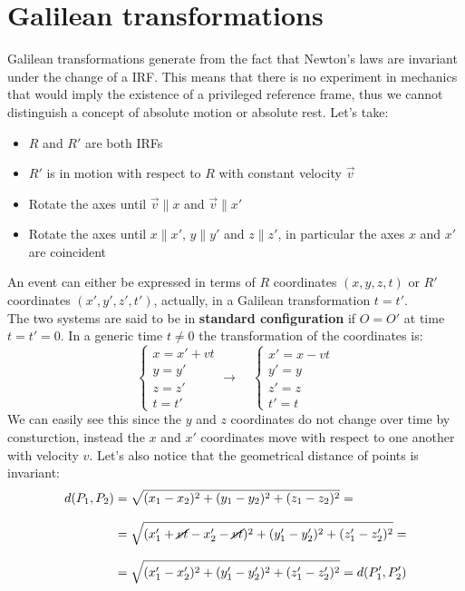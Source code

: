 \section{Galilean transformations}
Galilean transformations generate from the fact that Newton's laws are invariant under the change of a IRF. This means that there is no experiment in mechanics that would imply the existence of a privileged reference frame, thus we cannot distinguish a concept of absolute motion or absolute rest. Let's take:
\begin{itemize}
  \item $R$ and $R'$ are both IRFs
  \item $R'$ is in motion with respect to $R$ with constant velocity $\vec{v}$
  \item Rotate the axes until $\vec{v} \parallel x$ and $\vec{v} \parallel x'$
  \item Rotate the axes until $x \parallel x'$, $y \parallel y'$ and $z \parallel z'$, in particular the axes $x$ and $x'$ are coincident
\end{itemize}
An event can either be expressed in terms of $R$ coordinates $(x,y,z,t)$ or $R'$ coordinates $(x',y',z',t')$, actually, in a Galilean transformation $t=t'$.\\
The two systems are said to be in \textbf{standard configuration} if $O=O'$ at time $t=t'=0$. In a generic time $t\neq 0$ the transformation of the coordinates is:
\begin{equation}
  \begin{cases}
    x = x' + vt\\[8pt]
    y = y'\\[8pt]
    z = z'\\[8pt]
    t = t'
  \end{cases} \longrightarrow \quad
  \begin{cases}
    x' = x - vt\\[8pt]
    y' = y\\[8pt]
    z' = z\\[8pt]
    t' = t
  \end{cases}
\end{equation}
We can easily see this since the $y$ and $z$ coordinates do not change over time by consturction, instead the $x$ and $x'$ coordinates move with respect to one another with velocity $v$. Let's also notice that the geometrical distance of points is invariant:
\begin{equation}
  \begin{split}
    d(P_1,P_2) &= \sqrt{(x_1 - x_2)^2 + (y_1 - y_2)^2 + (z_1 - z_2)^2} =\\[8pt]
    &= \sqrt{(x'_1 + \cancel{vt} - x'_2 - \cancel{vt})^2 + (y'_1 - y'_2)^2 + (z'_1  - z'_2)^2} =\\[8pt]
    &= \sqrt{(x'_1 - x'_2)^2 + (y'_1 - y'_2)^2 + (z'_1  - z'_2)^2} = d(P'_1,P'_2)
  \end{split}
\end{equation}
